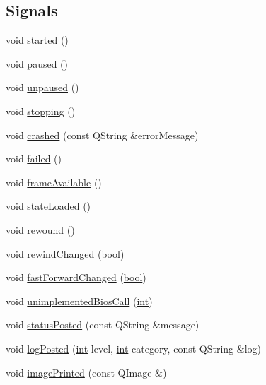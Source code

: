 \subsection*{Signals}
\begin{DoxyCompactItemize}
\item 
void \mbox{\hyperlink{class_q_g_b_a_1_1_core_controller_ab09314b20d031ba7015aafe48bfb8107}{started}} ()
\item 
void \mbox{\hyperlink{class_q_g_b_a_1_1_core_controller_a0a5e5e4aa4dad2654a5e16ac46cd75d3}{paused}} ()
\item 
void \mbox{\hyperlink{class_q_g_b_a_1_1_core_controller_ae4f3b1896454fad0d8d963e2ae495833}{unpaused}} ()
\item 
void \mbox{\hyperlink{class_q_g_b_a_1_1_core_controller_a5ee41c1bdc09690c5a5a650417cddcfa}{stopping}} ()
\item 
void \mbox{\hyperlink{class_q_g_b_a_1_1_core_controller_a68941609805ebefee0641cfac62fc01f}{crashed}} (const Q\+String \&error\+Message)
\item 
void \mbox{\hyperlink{class_q_g_b_a_1_1_core_controller_acfef425ed2e3bf107e440947bdb7910c}{failed}} ()
\item 
void \mbox{\hyperlink{class_q_g_b_a_1_1_core_controller_a90f0018c959e53a889e14716971b9812}{frame\+Available}} ()
\item 
void \mbox{\hyperlink{class_q_g_b_a_1_1_core_controller_a560e2751dafab257f447f5560257ec22}{state\+Loaded}} ()
\item 
void \mbox{\hyperlink{class_q_g_b_a_1_1_core_controller_a785569997ac7deaeb93cb2307adb2b19}{rewound}} ()
\item 
void \mbox{\hyperlink{class_q_g_b_a_1_1_core_controller_a541c4befdaaa0506f685fe558b082095}{rewind\+Changed}} (\mbox{\hyperlink{libretro_8h_a4a26dcae73fb7e1528214a068aca317e}{bool}})
\item 
void \mbox{\hyperlink{class_q_g_b_a_1_1_core_controller_af0aa64669e88804623a8660bc99cb68d}{fast\+Forward\+Changed}} (\mbox{\hyperlink{libretro_8h_a4a26dcae73fb7e1528214a068aca317e}{bool}})
\item 
void \mbox{\hyperlink{class_q_g_b_a_1_1_core_controller_a9bc1050a6f4a56afd974a7ed25a97298}{unimplemented\+Bios\+Call}} (\mbox{\hyperlink{ioapi_8h_a787fa3cf048117ba7123753c1e74fcd6}{int}})
\item 
void \mbox{\hyperlink{class_q_g_b_a_1_1_core_controller_a5f2f7c60e587d7a983654898d80802e0}{status\+Posted}} (const Q\+String \&message)
\item 
void \mbox{\hyperlink{class_q_g_b_a_1_1_core_controller_a7fd83cd7f60584e9071da1fd9043c0f6}{log\+Posted}} (\mbox{\hyperlink{ioapi_8h_a787fa3cf048117ba7123753c1e74fcd6}{int}} level, \mbox{\hyperlink{ioapi_8h_a787fa3cf048117ba7123753c1e74fcd6}{int}} category, const Q\+String \&log)
\item 
void \mbox{\hyperlink{class_q_g_b_a_1_1_core_controller_a130cba4cb7c5d2b98534c9f58cd7ada9}{image\+Printed}} (const Q\+Image \&)
\end{DoxyCompactItemize}
